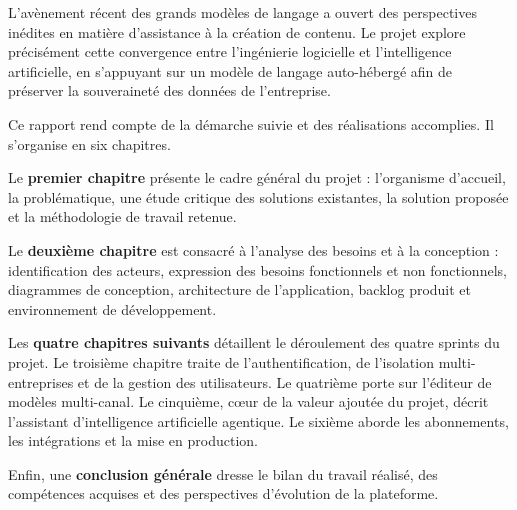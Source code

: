 L'avènement récent des grands modèles de langage a ouvert des perspectives
inédites en matière d'assistance à la création de contenu. Le projet
explore précisément cette convergence entre l'ingénierie logicielle et
l'intelligence artificielle, en s'appuyant sur un modèle de langage
auto-hébergé afin de préserver la souveraineté des données de l'entreprise.

Ce rapport rend compte de la démarche suivie et des réalisations
accomplies. Il s'organise en six chapitres.

Le \textbf{premier chapitre} présente le cadre général du projet :
l'organisme d'accueil, la problématique, une étude critique des solutions
existantes, la solution proposée et la méthodologie de travail retenue.

Le \textbf{deuxième chapitre} est consacré à l'analyse des besoins et à la
conception : identification des acteurs, expression des besoins
fonctionnels et non fonctionnels, diagrammes de conception, architecture de
l'application, backlog produit et environnement de développement.

Les \textbf{quatre chapitres suivants} détaillent le déroulement des quatre
sprints du projet. Le troisième chapitre traite de l'authentification, de
l'isolation multi-entreprises et de la gestion des utilisateurs. Le
quatrième porte sur l'éditeur de modèles multi-canal. Le cinquième, c\oe{}ur
de la valeur ajoutée du projet, décrit l'assistant d'intelligence
artificielle agentique. Le sixième aborde les abonnements, les
intégrations et la mise en production.

Enfin, une \textbf{conclusion générale} dresse le bilan du travail réalisé,
des compétences acquises et des perspectives d'évolution de la plateforme.
